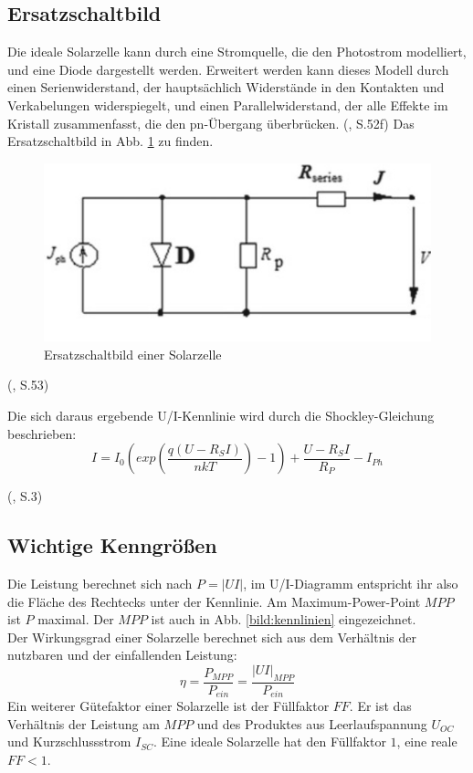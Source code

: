 

\subsection{Ersatzschaltbild}
Die ideale Solarzelle kann durch eine Stromquelle, die den Photostrom modelliert, und eine Diode dargestellt werden. 
Erweitert werden kann dieses Modell durch einen Serienwiderstand, der hauptsächlich Widerstände in den Kontakten und Verkabelungen
widerspiegelt, und einen Parallelwiderstand, der alle Effekte im Kristall zusammenfasst, die den pn-Übergang überbrücken.
(\cite{Shah2020}, S.52f)
Das Ersatzschaltbild in Abb. \ref{bild:ersatzschaltbild} zu finden.

\begin{figure}[h]
    \centering
    \includegraphics[scale=0.5]{Bilder/Ersatzschaltbild.png}
    \caption{Ersatzschaltbild einer Solarzelle}
    \label{bild:ersatzschaltbild}
\end{figure}
(\cite{Shah2020}, S.53)

Die sich daraus ergebende U/I-Kennlinie wird durch die Shockley-Gleichung beschrieben:
\begin{equation}
    I = I_0 (exp(\frac{q(U-R_SI)}{nkT})-1) + \frac{U-R_SI}{R_P} - I_{Ph}
\end{equation}

(\cite{Gerken2021}, S.3)

\subsection{Wichtige Kenngrößen}
Die Leistung berechnet sich nach $P = |UI|$, im U/I-Diagramm entspricht ihr also die Fläche des Rechtecks unter der Kennlinie. Am Maximum-Power-Point $MPP$ ist $P$ maximal. Der $MPP$ ist auch in Abb. \ref{bild:kennlinien} eingezeichnet. \\
Der Wirkungsgrad einer Solarzelle berechnet sich aus dem Verhältnis der nutzbaren und der einfallenden Leistung:
\begin{equation*}
\eta = \frac{P_{MPP}}{P_{ein}} = \frac{|UI|_{MPP}}{P_{ein}}
\end{equation*}
Ein weiterer Gütefaktor einer Solarzelle ist der Füllfaktor $FF$. Er ist das Verhältnis der Leistung am $MPP$ und des Produktes aus Leerlaufspannung $U_{OC}$ und Kurzschlussstrom $I_{SC}$. Eine ideale Solarzelle hat den Füllfaktor $1$, eine reale $FF < 1$.


